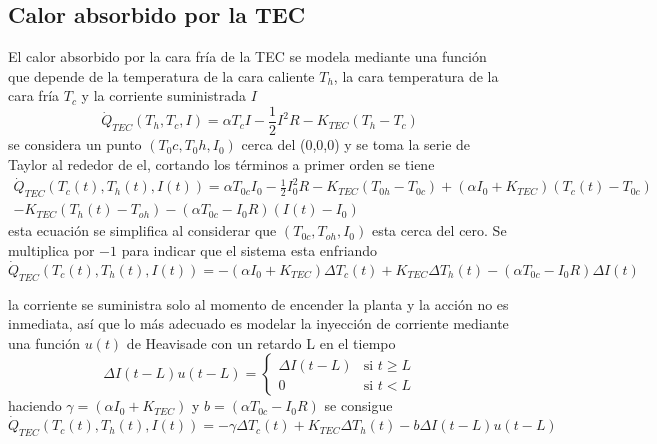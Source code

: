 \subsection{Calor absorbido por la TEC}
El calor absorbido por la cara fría de la TEC se modela mediante una función que depende de la temperatura de la cara caliente $T_{h}$, la cara temperatura de la cara fría $T_{c}$ y la corriente suministrada $I$
\begin{equation}
    \dot{Q}_{TEC}(T_{h}, T_{c}, I)= \alpha T_{c}I-\frac{1}{2}I^{2}R-K_{TEC}(T_h-T_c)
\end{equation}
se considera un punto $(T_0c, T_0h, I_0)$ cerca del (0,0,0) y se toma la serie de Taylor al rededor de el, cortando los términos a primer orden se tiene 
\begin{equation}
    \begin{split}
    \dot{Q}_{TEC}(T_{c}(t), T_{h}(t),I(t))= \alpha T_{0c}I_{0} -\frac{1}{2}I_{0}^2R -K_{TEC}(T_{0h}-T_{0c}) +(\alpha I_{0}+K_{TEC})(T_{c}(t)-T_{0c})\\ 
    -K_{TEC}(T_{h}(t)-T_{oh}) - (\alpha T_{0c}-I_{0}R)(I(t)-I_{0})
    \end{split}
\end{equation}
esta ecuación se simplifica al considerar que $(T_{0c}, T_{oh},I_{0})$ esta cerca del cero. Se multiplica por $-1$ para indicar que el sistema esta enfriando 
\begin{equation}
     \dot{Q}_{TEC}(T_{c}(t), T_{h}(t),I(t))= -(\alpha I_{0} + K_{TEC} )\Delta T_{c}(t)+K_{TEC}\Delta T_{h}(t) - (\alpha T_{0c}-I_{0}R)\Delta I(t)
\end{equation}

la corriente se suministra solo al momento de encender la planta y la acción no es inmediata, así que lo más adecuado es modelar la inyección de corriente mediante una función $u(t)$ de Heavisade con un retardo L en el tiempo
\begin{equation}
\Delta  I(t-L)u(t-L) =
\begin{cases}
    \Delta I(t-L) & \text{si } t \geq L\\
    0  & \text{si } t < L
\end{cases}
\end{equation}
haciendo $\gamma =(\alpha I_{0} + K_{TEC} )$ y $b=(\alpha T_{0c}-I_{0}R)$ se consigue 
\begin{equation}
     \dot{Q}_{TEC}(T_{c}(t), T_{h}(t),I(t))= -\gamma \Delta T_{c}(t)+K_{TEC}\Delta T_{h}(t) - b\Delta I(t-L)u(t-L)
\end{equation}
